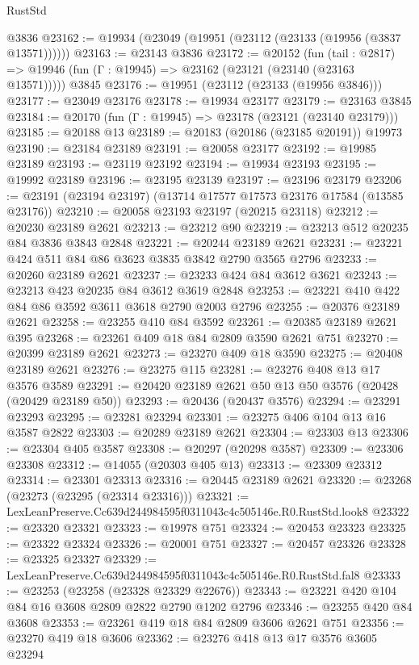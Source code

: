 \begin{lexlean}{RustStd}
\begin{coremodule}
    @3836
@23162 := @19934 (@23049 (@19951 (@23112 (@23133 (@19956 (@3837 @13571))))))
@23163 := @23143 @3836
@23172 := @20152
    (fun (tail : @2817) => @19946 (fun (Γ : @19945) => @23162 (@23121 (@23140 (@23163 @13571)))))
    @3845
@23176 := @19951 (@23112 (@23133 (@19956 @3846)))
@23177 := @23049 @23176
@23178 := @19934 @23177
@23179 := @23163 @3845
@23184 := @20170 (fun (Γ : @19945) => @23178 (@23121 (@23140 @23179)))
@23185 := @20188 @13
@23189 := @20183 (@20186 (@23185 @20191)) @19973
@23190 := @23184 @23189
@23191 := @20058 @23177
@23192 := @19985 @23189
@23193 := @23119 @23192
@23194 := @19934 @23193
@23195 := @19992 @23189
@23196 := @23195 @23139
@23197 := @23196 @23179
@23206 := @23191 (@23194 @23197) (@13714 @17577 @17573 @23176 @17584 (@13585 @23176))
@23210 := @20058 @23193 @23197 (@20215 @23118)
@23212 := @20230 @23189 @2621
@23213 := @23212 @90
@23219 := @23213 @512 @20235 @84 @3836 @3843 @2848
@23221 := @20244 @23189 @2621
@23231 := @23221 @424 @511 @84 @86 @3623 @3835 @3842 @2790 @3565 @2796
@23233 := @20260 @23189 @2621
@23237 := @23233 @424 @84 @3612 @3621
@23243 := @23213 @423 @20235 @84 @3612 @3619 @2848
@23253 := @23221 @410 @422 @84 @86 @3592 @3611 @3618 @2790 @2003 @2796
@23255 := @20376 @23189 @2621
@23258 := @23255 @410 @84 @3592
@23261 := @20385 @23189 @2621 @395
@23268 := @23261 @409 @18 @84 @2809 @3590 @2621 @751
@23270 := @20399 @23189 @2621
@23273 := @23270 @409 @18 @3590
@23275 := @20408 @23189 @2621
@23276 := @23275 @115
@23281 := @23276 @408 @13 @17 @3576 @3589
@23291 := @20420 @23189 @2621 @50 @13 @50 @3576 (@20428 (@20429 @23189 @50))
@23293 := @20436 (@20437 @3576)
@23294 := @23291 @23293
@23295 := @23281 @23294
@23301 := @23275 @406 @104 @13 @16 @3587 @2822
@23303 := @20289 @23189 @2621
@23304 := @23303 @13
@23306 := @23304 @405 @3587
@23308 := @20297 (@20298 @3587)
@23309 := @23306 @23308
@23312 := @14055 (@20303 @405 @13)
@23313 := @23309 @23312
@23314 := @23301 @23313
@23316 := @20445 @23189 @2621
@23320 := @23268 (@23273 (@23295 (@23314 @23316)))
@23321 := LexLeanPreserve.Cc639d244984595f0311043c4c505146e.R0.RustStd.look8
@23322 := @23320 @23321
@23323 := @19978 @751
@23324 := @20453 @23323
@23325 := @23322 @23324
@23326 := @20001 @751
@23327 := @20457 @23326
@23328 := @23325 @23327
@23329 := LexLeanPreserve.Cc639d244984595f0311043c4c505146e.R0.RustStd.fal8
@23333 := @23253 (@23258 (@23328 @23329 @22676))
@23343 := @23221 @420 @104 @84 @16 @3608 @2809 @2822 @2790 @1202 @2796
@23346 := @23255 @420 @84 @3608
@23353 := @23261 @419 @18 @84 @2809 @3606 @2621 @751
@23356 := @23270 @419 @18 @3606
@23362 := @23276 @418 @13 @17 @3576 @3605 @23294

\end{coremodule}
\end{lexlean}
